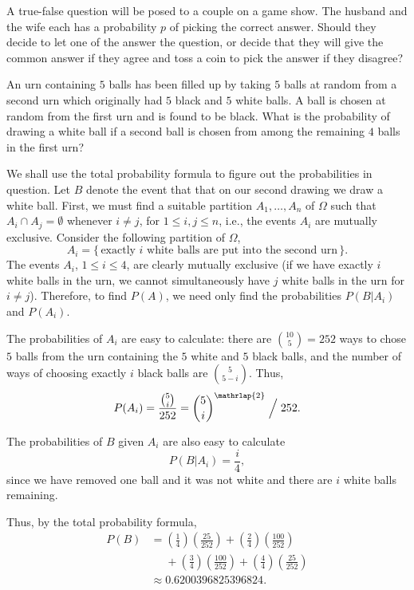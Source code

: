 \begin{problem}[Handout 4, \# 12]
  A true-false question will be posed to a couple on a game show. The
  husband and the wife each has a probability \(p\) of picking the correct
  answer. Should they decide to let one of the answer the question, or
  decide that they will give the common answer if they agree and toss a
  coin to pick the answer if they disagree?
\end{problem}
\begin{solution}

\end{solution}
\newpage

\begin{problem}[Handout 4, \# 13]
  An urn containing \(5\) balls has been filled up by taking \(5\) balls at
  random from a second urn which originally had \(5\) black and \(5\) white
  balls. A ball is chosen at random from the first urn and is found to be
  black. What is the probability of drawing a white ball if a second ball
  is chosen from among the remaining \(4\) balls in the first urn?
\end{problem}
\begin{solution}
  We shall use the total probability formula to figure out the
  probabilities in question. Let \(B\) denote the event that that on our
  second drawing we draw a white ball. First, we must find a suitable
  partition \(A_1,\dotsc,A_n\) of \(\Omega\) such that
  \(A_i\cap A_j=\emptyset\) whenever \(i\neq j\), for \(1\leq i,j\leq n\),
  i.e., the events \(A_i\) are mutually exclusive. Consider the following
  partition of \(\Omega\),
  \[
    A_i=\bigl\{\,\text{exactly \(i\) white balls are put into the second
      urn}\,\bigr\}.
  \]
  The events \(A_i\), \(1\leq i\leq 4\), are clearly mutually exclusive (if
  we have exactly \(i\) white balls in the urn, we cannot simultaneously
  have \(j\) white balls in the urn for \(i\neq j\)). Therefore, to find
  \(P(A)\), we need only find the probabilities \(P(B|A_i)\) and
  \(P(A_i)\).

  The probabilities of \(A_i\) are easy to calculate: there are
  \(\binom{10}{5}=252\) ways to chose \(5\) balls from the urn containing
  the \(5\) white and \(5\) black balls, and the number of ways of choosing
  exactly \(i\) black balls are \(\binom{5}{5-i}\). Thus,
  \[
    P(A_i)=\frac{\binom{5}{i}}{252}
    =\binom{5}{i}^{\mathrlap{2}}\Bigm/252.
  \]

  The probabilities of \(B\) given \(A_i\) are also easy to calculate
  \[
    P(B|A_i)=\frac{i}{4},
  \]
  since we have removed one ball and it was not white and there are \(i\)
  white balls remaining.

  Thus, by the total probability formula,
  \begin{align*}
    P(B)
    &=\left(\frac{1}{4}\right)\left(\frac{25}{252}\right)+
      \left(\frac{2}{4}\right)\left(\frac{100}{252}\right)\\
    &\phantom{{}={}}+\left(\frac{3}{4}\right)\left(\frac{100}{252}\right)+
      \left(\frac{4}{4}\right)\left(\frac{25}{252}\right)\\
    &\approx\num{0.6200396825396824}.
  \end{align*}
\end{solution}
\newpage

